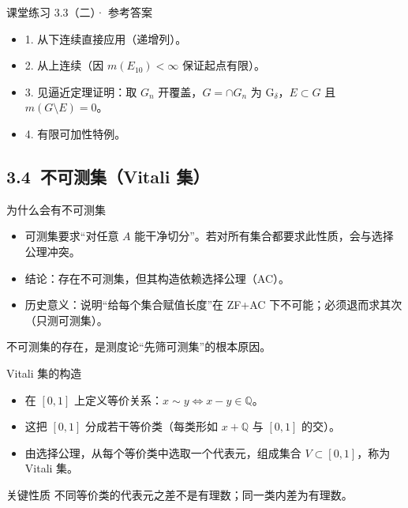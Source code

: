 \documentclass[aspectratio=169,11pt]{ctexbeamer}
\begin{document}
\begin{frame}{课堂练习 3.3（二）· 参考答案}
  \begin{itemize}
    \item 1. 从下连续直接应用（递增列）。
    \item 2. 从上连续（因 $m(E_{10})<\infty$ 保证起点有限）。
    \item 3. 见逼近定理证明：取 $G_n$ 开覆盖，$G=\cap G_n$ 为 G$_\delta$，$E\subset G$ 且 $m(G\setminus E)=0$。
    \item 4. 有限可加性特例。
  \end{itemize}
\end{frame}

\subsection{3.4\ 不可测集（Vitali 集）}

\begin{frame}{为什么会有不可测集}
  \begin{itemize}
    \item 可测集要求“对任意 $A$ 能干净切分”。若对\alert{所有}集合都要求此性质，会与选择公理冲突。
    \item 结论：\alert{存在不可测集}，但其构造依赖选择公理（AC）。
    \item 历史意义：说明“给每个集合赋值长度”在 ZF+AC 下不可能；必须退而求其次（只测可测集）。
  \end{itemize}
  \begin{center}
    \color{clouddeep}\small 不可测集的存在，是测度论“先筛可测集”的根本原因。
  \end{center}
\end{frame}

\begin{frame}{Vitali 集的构造}
  \begin{itemize}
    \item 在 $[0,1]$ 上定义等价关系：$x\sim y\Longleftrightarrow x-y\in\mathbb{Q}$。
    \item 这把 $[0,1]$ 分成若干\alert{等价类}（每类形如 $x+\mathbb{Q}$ 与 $[0,1]$ 的交）。
    \item 由\alert{选择公理}，从每个等价类中选取一个代表元，组成集合 $V\subset[0,1]$，称为\alert{Vitali 集}。
  \end{itemize}
  \begin{block}{关键性质}
    不同等价类的代表元之差\alert{不是}有理数；同一类内差为有理数。
  \end{block}
\end{frame}
\end{document}
